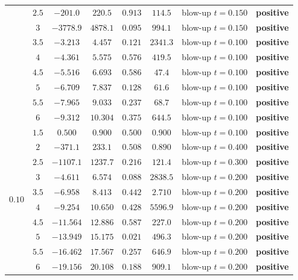 \documentclass[final,12pt,3p]{elsarticle}
\theoremstyle{plain}
\theoremstyle{definition}
\theoremstyle{remark}
\newcommand{\good}[1]{\textcolor{OliveGreen}{\textbf{#1}}}
\newcommand{\bad}[1]{\textcolor{BrickRed}{#1}}
\begin{document}
\begin{table}[htb]
{\begin{tabular}{cc|cc|cc|c|c}
& $2.5$ & $-201.0$ & $220.5$ & $0.913$ & $114.5$ & \bad{blow-up $t=0.150$} & \good{positive} \\
& $3$   & $-3778.9$ & $4878.1$ & $0.095$ & $994.1$ & \bad{blow-up $t=0.150$} & \good{positive} \\
& $3.5$ & $-3.213$ & $4.457$ & $0.121$ & $2341.3$ & \bad{blow-up $t=0.100$} & \good{positive} \\
& $4$   & $-4.361$ & $5.575$ & $0.576$ & $419.5$ & \bad{blow-up $t=0.100$} & \good{positive} \\
& $4.5$ & $-5.516$ & $6.693$ & $0.586$ & $47.4$ & \bad{blow-up $t=0.100$} & \good{positive} \\
& $5$   & $-6.709$ & $7.837$ & $0.128$ & $61.6$ & \bad{blow-up $t=0.100$} & \good{positive} \\
& $5.5$ & $-7.965$ & $9.033$ & $0.237$ & $68.7$ & \bad{blow-up $t=0.100$} & \good{positive} \\
& $6$   & $-9.312$ & $10.304$ & $0.375$ & $644.5$ & \bad{blow-up $t=0.100$} & \good{positive} \\
\hline
\multirow{10}{*}{$0.10$}
& $1.5$ & $0.500$ & $0.900$ & $0.500$ & $0.900$ & \bad{blow-up $t=0.100$} & \good{positive} \\
& $2$   & $-371.1$ & $233.1$ & $0.508$ & $0.890$ & \bad{blow-up $t=0.400$} & \good{positive} \\
& $2.5$ & $-1107.1$ & $1237.7$ & $0.216$ & $121.4$ & \bad{blow-up $t=0.300$} & \good{positive} \\
& $3$   & $-4.611$ & $6.574$ & $0.088$ & $2838.5$ & \bad{blow-up $t=0.200$} & \good{positive} \\
& $3.5$ & $-6.958$ & $8.413$ & $0.442$ & $2.710$ & \bad{blow-up $t=0.200$} & \good{positive} \\
& $4$   & $-9.254$ & $10.650$ & $0.428$ & $5596.9$ & \bad{blow-up $t=0.200$} & \good{positive} \\
& $4.5$ & $-11.564$ & $12.886$ & $0.587$ & $227.0$ & \bad{blow-up $t=0.200$} & \good{positive} \\
& $5$   & $-13.949$ & $15.175$ & $0.021$ & $496.3$ & \bad{blow-up $t=0.200$} & \good{positive} \\
& $5.5$ & $-16.462$ & $17.567$ & $0.257$ & $646.9$ & \bad{blow-up $t=0.200$} & \good{positive} \\
& $6$   & $-19.156$ & $20.108$ & $0.188$ & $909.1$ & \bad{blow-up $t=0.200$} & \good{positive} \\
\hline
\end{tabular}}
\end{table}
\end{document}
